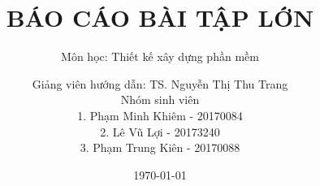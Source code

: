 \documentclass[11pt]{beamer}
\def\mydate{\leavevmode\hbox{\bfseries\the\day/\twodigits\month/\twodigits\year}}
\def\twodigits#1{\ifnum#1<10 0\fi\the#1}
\begin{document}
\author[Nhóm 13]{
	Giảng viên hướng dẫn: TS. Nguyễn Thị Thu Trang
	\vspace{.5in} 
	\begin{columns}
		\begin{column}{.5\linewidth}
			\centering
			Nhóm sinh viên
		\end{column}
		\begin{column}{.55\linewidth}
			1. Phạm Minh Khiêm - 20170084\\
			2. Lê Vũ Lợi - 20173240\\
			3. Phạm Trung Kiên - 20170088
		\end{column}
	\end{columns}
}
\title[]{\bfseries\fontsize{14}{\baselineskip}\selectfont BÁO CÁO BÀI TẬP LỚN\vspace{5pt}}
\subtitle{Môn học: Thiết kế xây dựng phần mềm}
\date[\mydate]{\today}
\end{document}
